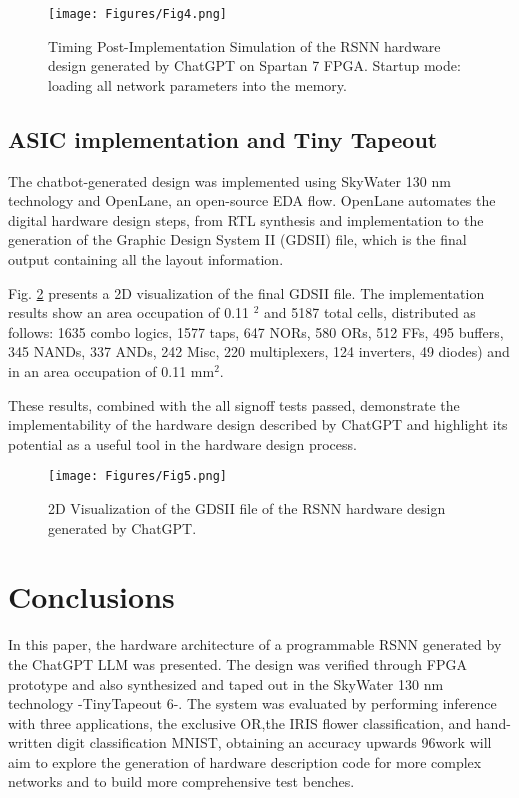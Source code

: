 \begin{figure}[t]
\centering
\centerline{\texttt{[image: Figures/Fig4.png]}}
\caption{Timing Post-Implementation Simulation of the RSNN hardware design generated by ChatGPT on Spartan 7 FPGA. Startup mode: loading all network parameters into the memory.}
\label{fig:simulation_2_startup}
\end{figure}



\subsection{ASIC implementation and Tiny Tapeout}
The chatbot-generated design was implemented using SkyWater 130 nm technology and OpenLane, an open-source EDA flow. 
OpenLane automates the digital hardware design steps, from RTL synthesis and implementation to the generation of the Graphic Design System II (GDSII) file, which is the final output containing all the layout information.


Fig. \ref{fig:gds} presents a 2D visualization of the final GDSII file.
The implementation results show an area occupation of 0.11 $^2$ and 5187 total cells, distributed as follows: 1635 combo logics, 1577 taps, 647 NORs, 580 ORs, 512 FFs, 495 buffers, 345 NANDs, 337 ANDs, 242 Misc, 220 multiplexers, 124 inverters, 49 diodes) and in an area occupation of 0.11 mm$^2$.

These results, combined with the all signoff tests passed, demonstrate the implementability of the hardware design described by ChatGPT and highlight its potential as a useful tool in the hardware design process.

\begin{figure}[t]
\centerline{\texttt{[image: Figures/Fig5.png]}}
\caption{2D Visualization of the GDSII file of the RSNN hardware design generated by ChatGPT.}
\label{fig:gds}
\end{figure}









\section{Conclusions}
In this paper, the hardware architecture of a programmable RSNN generated by the ChatGPT LLM was presented. The design was verified through FPGA prototype and also synthesized and taped out in the SkyWater 130 nm technology -TinyTapeout 6-. The system was evaluated by performing inference  with three applications, the exclusive OR,the  IRIS flower classification, and hand-written digit classification MNIST, obtaining an accuracy upwards 96\Future work will aim to explore the generation of hardware description code for more complex networks and to build more comprehensive test benches.






